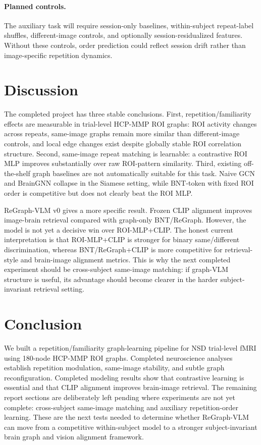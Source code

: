 \documentclass{article}
\begin{document}
\paragraph{Planned controls.}
The auxiliary task will require session-only baselines, within-subject repeat-label shuffles, different-image controls, and optionally session-residualized features. Without these controls, order prediction could reflect session drift rather than image-specific repetition dynamics.

\section{Discussion}

The completed project has three stable conclusions. First, repetition/familiarity effects are measurable in trial-level HCP-MMP ROI graphs: ROI activity changes across repeats, same-image graphs remain more similar than different-image controls, and local edge changes exist despite globally stable ROI correlation structure. Second, same-image repeat matching is learnable: a contrastive ROI MLP improves substantially over raw ROI-pattern similarity. Third, existing off-the-shelf graph baselines are not automatically suitable for this task. Naive GCN and BrainGNN collapse in the Siamese setting, while BNT-token with fixed ROI order is competitive but does not clearly beat the ROI MLP.

ReGraph-VLM v0 gives a more specific result. Frozen CLIP alignment improves image-brain retrieval compared with graph-only BNT/ReGraph. However, the model is not yet a decisive win over ROI-MLP+CLIP. The honest current interpretation is that ROI-MLP+CLIP is stronger for binary same/different discrimination, whereas BNT/ReGraph+CLIP is more competitive for retrieval-style and brain-image alignment metrics. This is why the next completed experiment should be cross-subject same-image matching: if graph-VLM structure is useful, its advantage should become clearer in the harder subject-invariant retrieval setting.

\section{Conclusion}

We built a repetition/familiarity graph-learning pipeline for NSD trial-level fMRI using 180-node HCP-MMP ROI graphs. Completed neuroscience analyses establish repetition modulation, same-image stability, and subtle graph reconfiguration. Completed modeling results show that contrastive learning is essential and that CLIP alignment improves brain-image retrieval. The remaining report sections are deliberately left pending where experiments are not yet complete: cross-subject same-image matching and auxiliary repetition-order learning. These are the next tests needed to determine whether ReGraph-VLM can move from a competitive within-subject model to a stronger subject-invariant brain graph and vision alignment framework.



\end{document}
